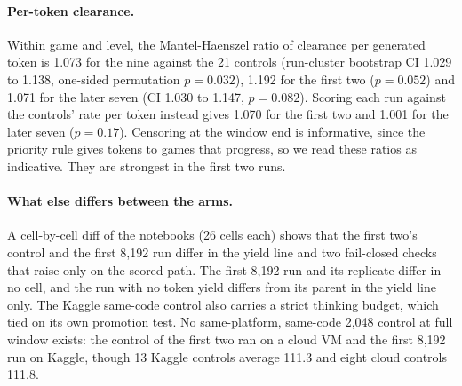 \begin{table}[!htb]
\caption{Jump in the probability that the next request acts at the yield threshold, local-linear, 95\% bootstrap over turns. The 2,048 rows pool three runs, the 8,192 rows use one.}\label{tab:rd}
\centering\footnotesize
{}
\end{table}

\paragraph{Per-token clearance.}
Within game and level, the Mantel-Haenszel ratio of clearance per generated token is 1.073 for the nine against the 21 controls (run-cluster bootstrap CI 1.029 to 1.138, one-sided permutation $p=0.032$), 1.192 for the first two ($p=0.052$) and 1.071 for the later seven (CI 1.030 to 1.147, $p=0.082$). %
Scoring each run against the controls' rate per token instead gives 1.070 for the first two and 1.001 for the later seven ($p=0.17$). %
Censoring at the window end is informative, since the priority rule gives tokens to games that progress, so we read these ratios as indicative. They are strongest in the first two runs. %

\paragraph{What else differs between the arms.}
A cell-by-cell diff of the notebooks (26 cells each) shows that the first two's control and the first 8,192 run differ in the yield line and two fail-closed checks that raise only on the scored path. The first 8,192 run and its replicate differ in no cell, and the run with no token yield differs from its parent in the yield line only. %
The Kaggle same-code control also carries a strict thinking budget, which tied on its own promotion test. %
No same-platform, same-code 2,048 control at full window exists: the control of the first two ran on a cloud VM and the first 8,192 run on Kaggle, though 13 Kaggle controls average 111.3 and eight cloud controls 111.8. %

